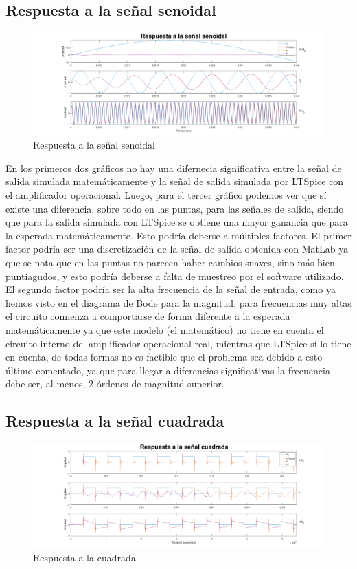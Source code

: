\subsection{Respuesta a la señal senoidal}
\begin{figure}[H]
    \centering
    \includegraphics[width=1\textwidth]{resources/Comparacion_senoidal_LT.png}
    \caption{Respuesta a la señal senoidal}
\end{figure}
En los primeros dos gráficos no hay una difernecia significativa entre la señal de salida simulada matemáticamente y la señal de salida simulada por LTSpice con el amplificador operacional. Luego, para el tercer gráfico podemos ver que sí existe una diferencia, sobre todo en las puntas, para las señales de salida, siendo que para la salida simulada con LTSpice se obtiene una mayor ganancia que para la esperada matemáticamente. Esto podría deberse a múltiples factores.
El primer factor podría ser una discretización de la señal de salida obtenida con MatLab ya que se nota que en las puntas no parecen haber cambios suaves, sino más bien puntiagudos, y esto podría deberse a falta de muestreo por el software utilizado.
El segundo factor podría ser la alta frecuencia de la señal de entrada, como ya hemos visto en el diagrama de Bode para la magnitud, para frecuencias muy altas el circuito comienza a comportarse de forma diferente a la esperada matemáticamente ya que este modelo (el matemático) no tiene en cuenta el circuito interno del amplificador operacional real, mientras que LTSpice sí lo tiene en cuenta, de todas formas no es factible que el problema sea debido a esto último comentado, ya que para llegar a diferencias significativas la frecuencia debe ser, al menos, 2 órdenes de magnitud superior.

\subsection{Respuesta a la señal cuadrada}
\begin{figure}[H]
    \centering
    \includegraphics[width=1\textwidth]{resources/Comparacion_Cuadrada_LT.png}
    \caption{Respuesta a la cuadrada}
\end{figure}

